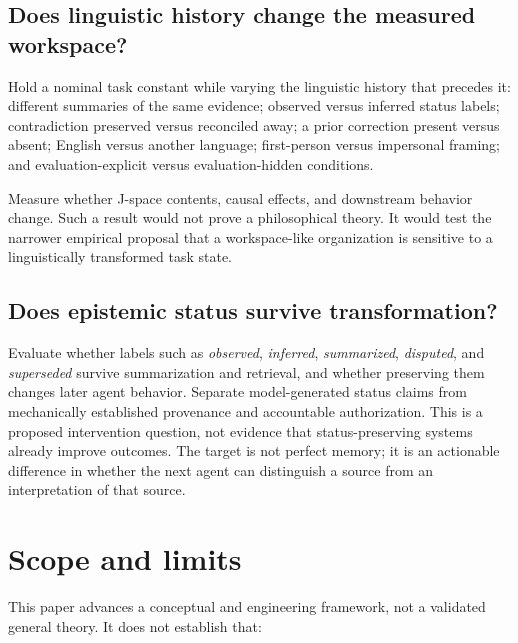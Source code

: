\documentclass[12pt]{article}
\begin{document}
\subsection{Does linguistic history change the measured workspace?}\label{does-linguistic-history-change-the-measured-workspace}

Hold a nominal task constant while varying the linguistic history that precedes it: different summaries of the same evidence; observed versus inferred status labels; contradiction preserved versus reconciled away; a prior correction present versus absent; English versus another language; first-person versus impersonal framing; and evaluation-explicit versus evaluation-hidden conditions.

Measure whether J-space contents, causal effects, and downstream behavior change. Such a result would not prove a philosophical theory. It would test the narrower empirical proposal that a workspace-like organization is sensitive to a linguistically transformed task state.

\subsection{Does epistemic status survive transformation?}\label{does-epistemic-status-survive-transformation}

Evaluate whether labels such as \emph{observed}, \emph{inferred}, \emph{summarized}, \emph{disputed}, and \emph{superseded} survive summarization and retrieval, and whether preserving them changes later agent behavior. Separate model-generated status claims from mechanically established provenance and accountable authorization. This is a proposed intervention question, not evidence that status-preserving systems already improve outcomes. The target is not perfect memory; it is an actionable difference in whether the next agent can distinguish a source from an interpretation of that source.

\section{Scope and limits}\label{scope-and-limits}

This paper advances a conceptual and engineering framework, not a validated general theory. It does not establish that:
\end{document}
